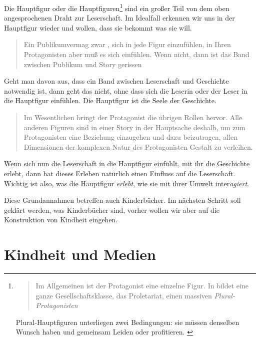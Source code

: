 Die Hauptfigur oder die Hauptfiguren\footnote{\blockcquote[155]{McKee2001}{Im Allgemeinen ist der Protagonist eine einzelne Figur. \textelp{} In  bildet eine ganze Gesellschaftsklasse, das Proletariat, einen massiven \emph{Plural-Protagonisten}}
Plural-Hauptfiguren unterliegen zwei Bedingungen: sie müssen denselben Wunsch haben und gemeinsam Leiden oder profitieren. \parencite[155]{McKee2001}} sind ein großer Teil von dem oben angesprochenen Draht zur Leserschaft. Im Idealfall erkennen wir uns in der Hauptfigur wieder und wollen, dass sie bekommt was sie will. \parencite[161]{McKee2001} \blockcquote[161]{McKee2001}{Ein Publikum\textelp{}vermag zwar , sich in jede Figur einzufühlen, in Ihren Protagonisten aber muß es sich einfühlen. Wenn nicht, dann ist das Band zwischen Publikum und Story gerissen}
Geht man davon aus, dass ein Band zwischen Leserschaft und Geschichte notwendig ist, dann geht das nicht, ohne dass sich die Leserin oder der Leser in die Hauptfigur einfühlen. Die Hauptfigur ist die Seele der Geschichte.  \blockcquote[407]{McKee2001}{Im Wesentlichen bringt der Protagonist die übrigen Rollen hervor. Alle anderen Figuren sind in einer Story in der Hauptsache deshalb, um zum Protagonisten eine Beziehung einzugehen und dazu beizutragen, allen Dimensionen der komplexen Natur des Protagonisten Gestalt zu verleihen.}  
Wenn sich nun die Leserschaft in die Hauptfigur einfühlt, mit ihr die Geschichte erlebt, dann hat dieses Erleben natürlich einen Einfluss auf die Leserschaft. Wichtig ist also, was die Hauptfigur \emph{erlebt}, wie sie mit ihrer Umwelt inter\emph{agiert}.
	 
Diese Grundannahmen betreffen auch Kinderbücher. Im nächsten Schritt soll geklärt werden, was Kinderbücher sind, vorher wollen wir aber auf die Konstruktion von Kindheit eingehen.

\section{Kindheit und Medien}

